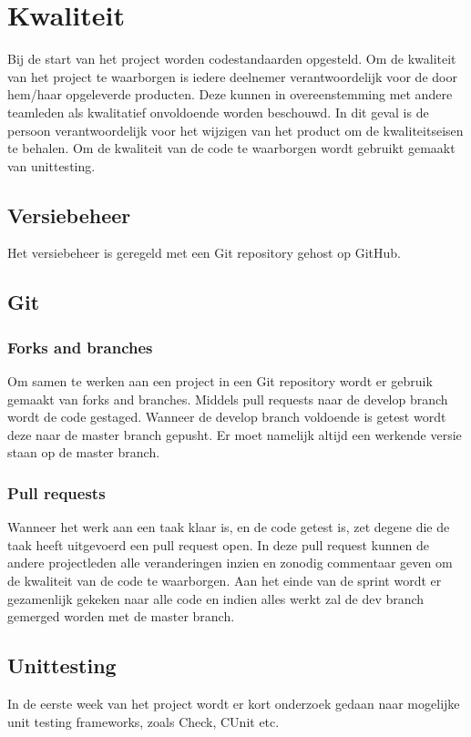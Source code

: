 \section{Kwaliteit}
Bij de start van het project worden codestandaarden opgesteld. Om de kwaliteit
van het project te waarborgen is iedere deelnemer verantwoordelijk voor de door
hem/haar opgeleverde producten. Deze kunnen in overeenstemming met andere
teamleden als kwalitatief onvoldoende worden beschouwd. In dit geval is de
persoon verantwoordelijk voor het wijzigen van het product om de kwaliteitseisen 
te behalen. Om de kwaliteit van de code te waarborgen wordt gebruikt gemaakt van 
unittesting.

\subsection{Versiebeheer}
\label{sec:versiebeheer}

Het versiebeheer is geregeld met een Git repository gehost op GitHub.

\subsection{Git}
\subsubsection{Forks and branches}
Om samen te werken aan een project in een Git repository wordt er gebruik
gemaakt van forks and branches. Middels pull requests naar de develop branch
wordt de code gestaged. Wanneer de develop branch voldoende is getest wordt
deze naar de master branch gepusht. Er moet namelijk altijd een werkende versie
staan op de master branch.

\subsubsection{Pull requests}
Wanneer het werk aan een taak klaar is, en de code getest is, zet degene die de
taak heeft uitgevoerd een pull request open. In deze pull request kunnen de andere
projectleden alle veranderingen inzien en zonodig commentaar geven om de kwaliteit
van de code te waarborgen.
Aan het einde van de sprint wordt er gezamenlijk gekeken naar alle code
en indien alles werkt zal de dev branch gemerged worden met de master branch.

\subsection{Unittesting}
In de eerste week van het project wordt er kort onderzoek gedaan naar mogelijke
unit testing frameworks, zoals Check, CUnit etc.

